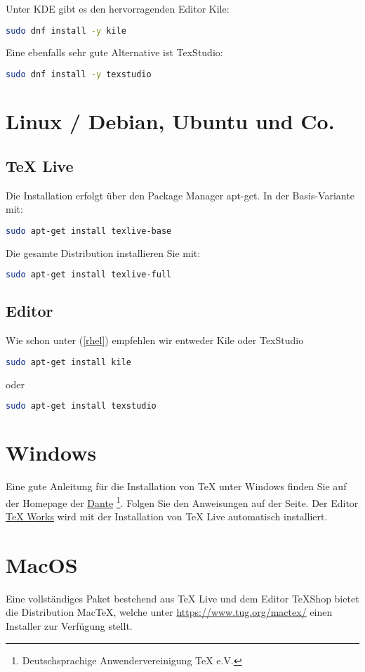 \documentclass[a4paper,10pt]{article}
\begin{document}
Unter KDE gibt es den hervorragenden Editor Kile:
\begin{lstlisting}[language=bash]
sudo dnf install -y kile
\end{lstlisting}
Eine ebenfalls sehr gute Alternative ist TexStudio:
\begin{lstlisting}[language=bash]
sudo dnf install -y texstudio
\end{lstlisting}

\section{Linux / Debian, Ubuntu und Co.}
\subsection{TeX Live}
Die Installation erfolgt über den Package Manager apt-get. In der Basis-Variante mit:

\begin{lstlisting}[language=bash]
sudo apt-get install texlive-base
\end{lstlisting}
Die gesamte Distribution installieren Sie mit:
\begin{lstlisting}[language=bash]
sudo apt-get install texlive-full
\end{lstlisting}

\subsection{Editor}

Wie schon unter (\ref{rhel}) empfehlen wir entweder Kile oder TexStudio
\begin{lstlisting}[language=bash]
sudo apt-get install kile
\end{lstlisting}
oder
\begin{lstlisting}[language=bash]
sudo apt-get install texstudio
\end{lstlisting}

\section{Windows}
Eine gute Anleitung für die Installation von TeX unter Windows finden Sie auf der Homepage der \href{https://www.dante.de/installation-von-tex-live-unter-windows/}{Dante} \footnote{Deutschsprachige Anwendervereinigung TeX e.V.}. Folgen Sie den Anweisungen auf der Seite. Der Editor \href{https://github.com/TeXworks/texworks/releases}{TeX Works} wird mit der Installation von TeX Live automatisch  installiert.

\section{MacOS}
Eine vollständiges Paket bestehend aus TeX Live und dem Editor TeXShop bietet die Distribution MacTeX, welche unter \href{https://www.tug.org/mactex/}{https://www.tug.org/mactex/} einen Installer zur Verfügung stellt. 
\end{document}
